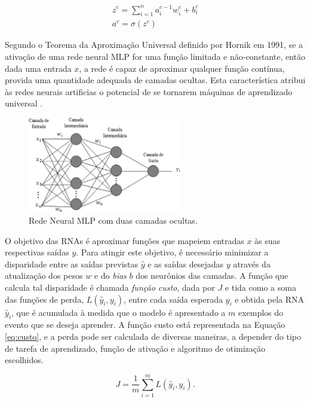 \begin{gather}\label{eq:funcao_neuronio_camadas}
	z^c = \sum_{i=1}^n a_i^{c-1} w_i^c + b_i^c\\
	a^c = \sigma(z^c)
\end{gather}

Segundo o Teorema da Aproximação Universal definido por Hornik em 1991, se a ativação de uma rede neural MLP for uma função limitada e não-constante, então dada uma entrada $x$, a rede é capaz de aproximar qualquer função contínua, provida uma quantidade adequada de camadas ocultas. Esta característica atribui às redes neurais artificias o potencial de se tornarem máquinas de aprendizado universal \cite{hornik1991approximation}.

\begin{figure}[ht]
	\centering
	\caption{Rede Neural MLP com duas camadas ocultas.}
	\label{fig:mlp}
	\includegraphics[width=0.6\textwidth]{img/mlprna.jpg}
\end{figure}

O objetivo das RNAs é aproximar funções que mapeiem entradas $x$ às suas respectivas saídas $y$. Para atingir este objetivo, é necessário minimizar a disparidade entre as saídas previstas $\hat{y}$ e as saídas desejadas $y$ através da atualização dos pesos $w$ e do \emph{bias} $b$ dos neurônios das camadas. A função que calcula tal disparidade é chamada \emph{função custo}, dada por $J$ e tida como a soma das funções de perda, $L(\hat{y}_i, y_i)$, entre cada saída esperada $y_i$ e obtida pela RNA $\hat{y}_i$, que é acumulada à medida que o modelo é apresentado a $m$ exemplos do evento que se deseja aprender. A função custo está representada na Equação \ref{eq:custo}, e a perda pode ser calculada de diversas maneiras, a depender do tipo de tarefa de aprendizado, função de ativação e algoritmo de otimização escolhidos.

\begin{equation}\label{eq:custo}
J = \frac{1}{m} \sum_{i=1}^{m} L(\hat{y}_{i}, y_{i}).
\end{equation}

